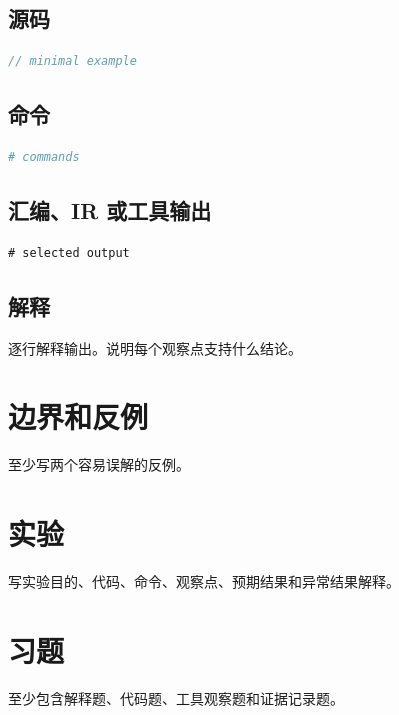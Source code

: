 \subsection{源码}

\begin{lstlisting}[language=C++]
// minimal example
\end{lstlisting}

\subsection{命令}

\begin{lstlisting}[language=bash]
# commands
\end{lstlisting}

\subsection{汇编、IR 或工具输出}

\begin{lstlisting}
# selected output
\end{lstlisting}

\subsection{解释}

逐行解释输出。说明每个观察点支持什么结论。

\section{边界和反例}

至少写两个容易误解的反例。

\section{实验}

\begin{labbox}
写实验目的、代码、命令、观察点、预期结果和异常结果解释。
\end{labbox}

\section{习题}

\begin{exercisebox}
至少包含解释题、代码题、工具观察题和证据记录题。
\end{exercisebox}

